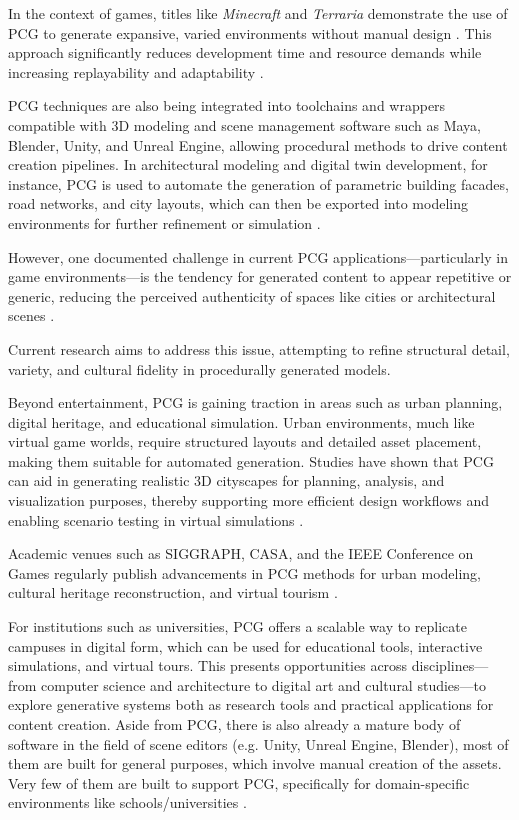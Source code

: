 \documentclass[manuscript,screen,12pt]{article}
\begin{document}
In the context of games, titles like \emph{Minecraft} and \emph{Terraria} demonstrate the use of PCG to generate expansive, varied environments without manual design \citep{shaker2016}. This approach significantly reduces development time and resource demands while increasing replayability and adaptability \citep{lazaridis2024}.

PCG techniques are also being integrated into toolchains and wrappers compatible with 3D modeling and scene management software such as Maya, Blender, Unity, and Unreal Engine, allowing procedural methods to drive content creation pipelines. In architectural modeling and digital twin development, for instance, PCG is used to automate the generation of parametric building facades, road networks, and city layouts, which can then be exported into modeling environments for further refinement or simulation \citep{muller2006, parish2001}.

However, one documented challenge in current PCG applications—particularly in game environments—is the tendency for generated content to appear repetitive or generic, reducing the perceived authenticity of spaces like cities or architectural scenes \citep{togelius2013}.

Current research aims to address this issue, attempting to refine structural detail, variety, and cultural fidelity in procedurally generated models.

Beyond entertainment, PCG is gaining traction in areas such as urban planning, digital heritage, and educational simulation. Urban environments, much like virtual game worlds, require structured layouts and detailed asset placement, making them suitable for automated generation. Studies have shown that PCG can aid in generating realistic 3D cityscapes for planning, analysis, and visualization purposes, thereby supporting more efficient design workflows and enabling scenario testing in virtual simulations \citep{kim2018, parish2001}.

Academic venues such as SIGGRAPH, CASA, and the IEEE Conference on Games regularly publish advancements in PCG methods for urban modeling, cultural heritage reconstruction, and virtual tourism \citep{watson2008}.

For institutions such as universities, PCG offers a scalable way to replicate campuses in digital form, which can be used for educational tools, interactive simulations, and virtual tours. This presents opportunities across disciplines—from computer science and architecture to digital art and cultural studies—to explore generative systems both as research tools and practical applications for content creation. Aside from PCG, there is also already a mature body of software in the field of scene editors (e.g. Unity, Unreal Engine, Blender), most of them are built for general purposes, which involve manual creation of the assets. Very few of them are built to support PCG, specifically for domain-specific environments like schools/universities \citep{smith2011, togelius2016}.
\end{document}
